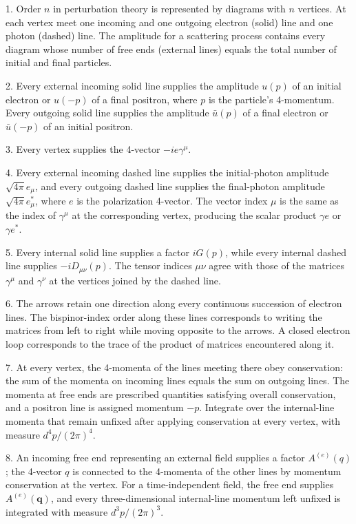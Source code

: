 1. Order $n$ in perturbation theory is represented by diagrams with $n$ vertices. At each vertex meet one incoming and one outgoing electron (solid) line and one photon (dashed) line. The amplitude for a scattering process contains every diagram whose number of free ends (external lines) equals the total number of initial and final particles.

2. Every external incoming solid line supplies the amplitude $u(p)$ of an initial electron or $u(-p)$ of a final positron, where $p$ is the particle's 4-momentum. Every outgoing solid line supplies the amplitude $\bar u(p)$ of a final electron or $\bar u(-p)$ of an initial positron.

3. Every vertex supplies the 4-vector $-ie\gamma^\mu$.

4. Every external incoming dashed line supplies the initial-photon amplitude $\sqrt{4\pi}e_\mu$, and every outgoing dashed line supplies the final-photon amplitude $\sqrt{4\pi}e_\mu^*$, where $e$ is the polarization 4-vector. The vector index $\mu$ is the same as the index of $\gamma^\mu$ at the corresponding vertex, producing the scalar product $\gamma e$ or $\gamma e^*$.

5. Every internal solid line supplies a factor $iG(p)$, while every internal dashed line supplies $-iD_{\mu\nu}(p)$. The tensor indices $\mu\nu$ agree with those of the matrices $\gamma^\mu$ and $\gamma^\nu$ at the vertices joined by the dashed line.

6. The arrows retain one direction along every continuous succession of electron lines. The bispinor-index order along these lines corresponds to writing the matrices from left to right while moving opposite to the arrows. A closed electron loop corresponds to the trace of the product of matrices encountered along it.

7. At every vertex, the 4-momenta of the lines meeting there obey conservation: the sum of the momenta on incoming lines equals the sum on outgoing lines. The momenta at free ends are prescribed quantities satisfying overall conservation, and a positron line is assigned momentum $-p$. Integrate over the internal-line momenta that remain unfixed after applying conservation at every vertex, with measure $d^4p/(2\pi)^4$.

8. An incoming free end representing an external field supplies a factor $A^{(e)}(q)$; the 4-vector $q$ is connected to the 4-momenta of the other lines by momentum conservation at the vertex. For a time-independent field, the free end supplies $A^{(e)}(\mathbf q)$, and every three-dimensional internal-line momentum left unfixed is integrated with measure $d^3p/(2\pi)^3$.


